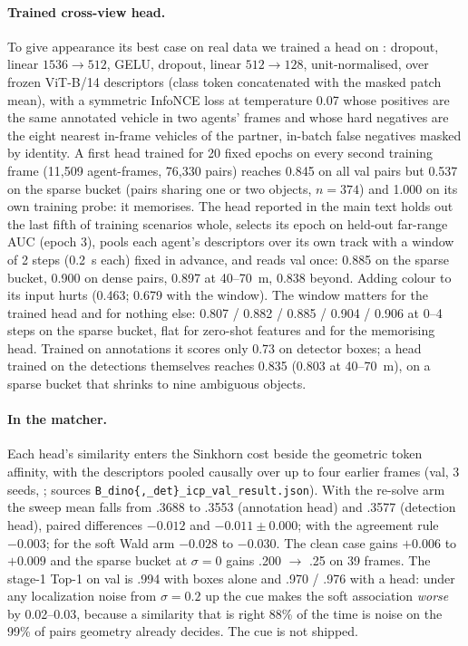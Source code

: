 \paragraph{Trained cross-view head.}
To give appearance its best case on real data we trained a head on \vxreal: dropout, linear $1536\!\to\!512$, GELU, dropout, linear $512\!\to\!128$, unit-normalised, over frozen ViT-B/14 descriptors (class token concatenated with the masked patch mean), with a symmetric InfoNCE loss at temperature 0.07 whose positives are the same annotated vehicle in two agents' frames and whose hard negatives are the eight nearest in-frame vehicles of the partner, in-batch false negatives masked by identity. A first head trained for 20 fixed epochs on every second training frame (11,509 agent-frames, 76,330 pairs) reaches 0.845 on all val pairs but 0.537 on the sparse bucket (pairs sharing one or two objects, $n{=}374$) and 1.000 on its own training probe: it memorises. The head reported in the main text holds out the last fifth of training scenarios whole, selects its epoch on held-out far-range AUC (epoch 3), pools each agent's descriptors over its own track with a window of 2 steps (\SI{0.2}{s} each) fixed in advance, and reads val once: 0.885 on the sparse bucket, 0.900 on dense pairs, 0.897 at 40--\SI{70}{m}, 0.838 beyond. Adding colour to its input hurts (0.463; 0.679 with the window). The window matters for the trained head and for nothing else: 0.807 / 0.882 / 0.885 / 0.904 / 0.906 at 0--4 steps on the sparse bucket, flat for zero-shot features and for the memorising head. Trained on annotations it scores only 0.73 on detector boxes; a head trained on the detections themselves reaches 0.835 (0.803 at 40--\SI{70}{m}), on a sparse bucket that shrinks to nine ambiguous objects.

\paragraph{In the matcher.}
Each head's similarity enters the Sinkhorn cost beside the geometric token affinity, with the descriptors pooled causally over up to four earlier frames (\vxreal val, 3 seeds, ; sources \texttt{B\_dino\{,\_det\}\_icp\_val\_result.json}). With the re-solve arm the sweep mean falls from .3688 to .3553 (annotation head) and .3577 (detection head), paired differences $-0.012$ and $-0.011\pm0.000$; with the agreement rule $-0.003$; for the soft Wald arm $-0.028$ to $-0.030$. The clean case gains $+0.006$ to $+0.009$ and the sparse bucket at $\sigma{=}0$ gains .200 $\to$ .25 on 39 frames. The stage-1 Top-1 on val is .994 with boxes alone and .970 / .976 with a head: under any localization noise from $\sigma{=}0.2$ up the cue makes the soft association \emph{worse} by 0.02--0.03, because a similarity that is right 88\% of the time is noise on the 99\% of pairs geometry already decides. The cue is not shipped.

